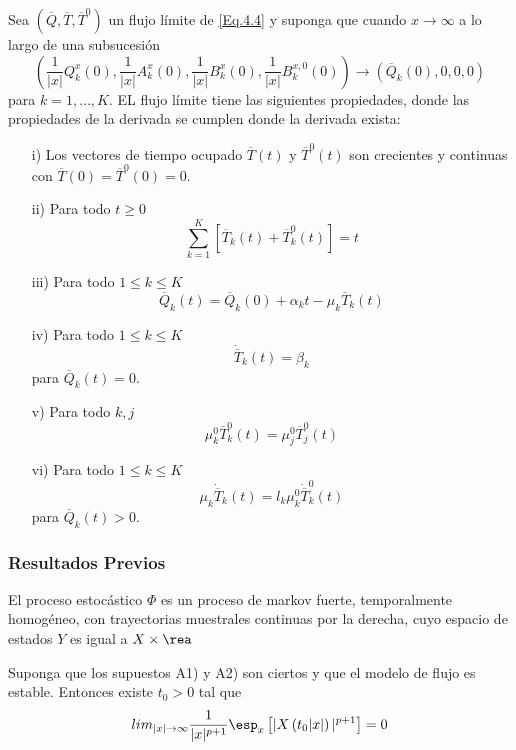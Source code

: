 \begin{Prop}
 Sea $\left(\overline{Q},\overline{T},\overline{T}^{0}\right)$ un flujo l\'imite de \ref{Eq.4.4} y suponga que cuando $x\rightarrow\infty$ a lo largo de
una subsucesi\'on
\[\left(\frac{1}{|x|}Q_{k}^{x}\left(0\right),\frac{1}{|x|}A_{k}^{x}\left(0\right),\frac{1}{|x|}B_{k}^{x}\left(0\right),\frac{1}{|x|}B_{k}^{x,0}\left(0\right)\right)\rightarrow\left(\overline{Q}_{k}\left(0\right),0,0,0\right)\]
para $k=1,\ldots,K$. EL flujo l\'imite tiene las siguientes
propiedades, donde las propiedades de la derivada se cumplen donde
la derivada exista:
\begin{itemize}
 \item[i)] Los vectores de tiempo ocupado $\overline{T}\left(t\right)$ y $\overline{T}^{0}\left(t\right)$ son crecientes y continuas con
$\overline{T}\left(0\right)=\overline{T}^{0}\left(0\right)=0$.
\item[ii)] Para todo $t\geq0$
\[\sum_{k=1}^{K}\left[\overline{T}_{k}\left(t\right)+\overline{T}_{k}^{0}\left(t\right)\right]=t\]
\item[iii)] Para todo $1\leq k\leq K$
\[\overline{Q}_{k}\left(t\right)=\overline{Q}_{k}\left(0\right)+\alpha_{k}t-\mu_{k}\overline{T}_{k}\left(t\right)\]
\item[iv)]  Para todo $1\leq k\leq K$
\[\dot{{\overline{T}}}_{k}\left(t\right)=\beta_{k}\] para $\overline{Q}_{k}\left(t\right)=0$.
\item[v)] Para todo $k,j$
\[\mu_{k}^{0}\overline{T}_{k}^{0}\left(t\right)=\mu_{j}^{0}\overline{T}_{j}^{0}\left(t\right)\]
\item[vi)]  Para todo $1\leq k\leq K$
\[\mu_{k}\dot{{\overline{T}}}_{k}\left(t\right)=l_{k}\mu_{k}^{0}\dot{{\overline{T}}}_{k}^{0}\left(t\right)\] para $\overline{Q}_{k}\left(t\right)>0$.
\end{itemize}
\end{Prop}

\subsubsection{Resultados Previos}

\begin{Lemma}\label{Lema.34.MeynDown}
El proceso estoc\'astico $\Phi$ es un proceso de markov fuerte,
temporalmente homog\'eneo, con trayectorias muestrales continuas
por la derecha, cuyo espacio de estados $Y$ es igual a
$X\times\rea$
\end{Lemma}
\begin{Prop}
 Suponga que los supuestos A1) y A2) son ciertos y que el modelo de flujo es estable. Entonces existe $t_{0}>0$ tal que
\begin{equation}
 lim_{|x|\rightarrow\infty}\frac{1}{|x|^{p+1}}\esp_{x}\left[|X\left(t_{0}|x|\right)|^{p+1}\right]=0
\end{equation}
\end{Prop}


